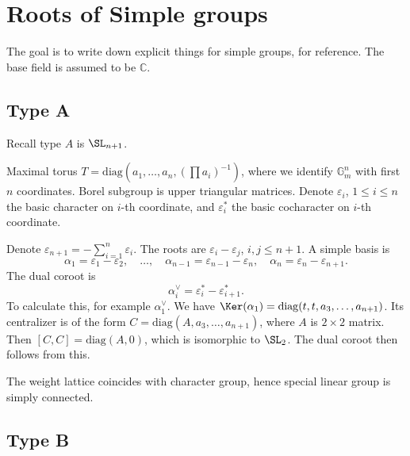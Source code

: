 \documentclass[a4paper]{amsart}
\newcommand{\BC}{{\mathbb {C}}} \newcommand{\BD}{{\mathbb {D}}}
\newcommand{\BG}{{\mathbb {G}}} \newcommand{\BH}{{\mathbb {H}}}
\newcommand{\diag}{{\mathrm{diag}}}
\theoremstyle{plain}
\theoremstyle{remark} \newtheorem{remark}[thm]{Remark}
\theoremstyle{remark} \newtheorem{exercise}{Exercise}
\theoremstyle{remark} \newtheorem{example}{Example}
\numberwithin{equation}{section}
\begin{document}




\section{Roots of Simple groups}

The goal is to write down explicit things for simple groups, for reference. The base field is assumed to be $\BC$.

\subsection{Type A}

Recall type $A$ is $\SL_{n+1}$.

Maximal torus $T=\diag(a_1,\ldots,a_n,(\prod a_i)^{-1})$, where we identify $\BG_m^n$ with first $n$ coordinates. Borel subgroup is upper triangular matrices. Denote $\varepsilon_i$, $1\leqslant i\leqslant n$ the basic character on $i$-th coordinate, and $\varepsilon_i^*$ the basic cocharacter on $i$-th coordinate.

Denote $\varepsilon_{n+1}=-\sum_{i=1}^n\varepsilon_i$. The roots are $\varepsilon_i-\varepsilon_j$, $i,j\leqslant n+1$. A simple basis is
\[\alpha_1=\varepsilon_1-\varepsilon_2,\quad\ldots,\quad\alpha_{n-1}=\varepsilon_{n-1}-\varepsilon_n,\quad\alpha_n=\varepsilon_n-\varepsilon_{n+1}.\]
The dual coroot is
\[\alpha_i^\vee=\varepsilon_i^*-\varepsilon_{i+1}^*.\]
To calculate this, for example $\alpha^\vee_1$. We have $\Ker(\alpha_1)=\diag(t,t,a_3,\ldots,a_{n+1})$. Its centralizer is of the form $C=\diag(A,a_3,\ldots,a_{n+1})$, where $A$ is $2\times 2$ matrix. Then $[C,C]=\diag(A,0)$, which is isomorphic to $\SL_2$. The dual coroot then follows from this.

The weight lattice coincides with character group, hence special linear group is simply connected.

\subsection{Type B}
\end{document}
